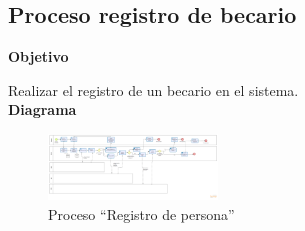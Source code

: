 










\newpage
\subsection{Proceso registro de becario}

\textbf{Objetivo} 

Realizar el registro de un becario en el sistema.\\
\newpage
\textbf{Diagrama} 
\begin{figure}[H]
\begin{center}
\includegraphics[angle=90,  width=0.4\textwidth]{marcoTeorico/imagenes/Proceso_RegistroPersonas.png}
\caption{Proceso ``Registro de persona''}
\end{center}
\end{figure}

